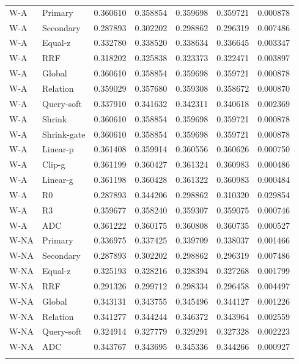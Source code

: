 \begin{table}[htbp]
\begin{tabular}{llrrrrr}
\addlinespace
W-A & Primary & 0.360610 & 0.358854 & 0.359698 & 0.359721 & 0.000878\\
W-A & Secondary & 0.287893 & 0.302202 & 0.298862 & 0.296319 & 0.007486\\
W-A & Equal-z & 0.332780 & 0.338520 & 0.338634 & 0.336645 & 0.003347\\
W-A & RRF & 0.318202 & 0.325838 & 0.323373 & 0.322471 & 0.003897\\
W-A & Global & 0.360610 & 0.358854 & 0.359698 & 0.359721 & 0.000878\\
W-A & Relation & 0.359029 & 0.357680 & 0.359308 & 0.358672 & 0.000870\\
W-A & Query-soft & 0.337910 & 0.341632 & 0.342311 & 0.340618 & 0.002369\\
W-A & Shrink & 0.360610 & 0.358854 & 0.359698 & 0.359721 & 0.000878\\
W-A & Shrink-gate & 0.360610 & 0.358854 & 0.359698 & 0.359721 & 0.000878\\
W-A & Linear-p & 0.361408 & 0.359914 & 0.360556 & 0.360626 & 0.000750\\
W-A & Clip-g & 0.361199 & 0.360427 & 0.361324 & 0.360983 & 0.000486\\
W-A & Linear-g & 0.361198 & 0.360428 & 0.361322 & 0.360983 & 0.000484\\
W-A & R0 & 0.287893 & 0.344206 & 0.298862 & 0.310320 & 0.029854\\
W-A & R3 & 0.359677 & 0.358240 & 0.359307 & 0.359075 & 0.000746\\
W-A & ADC & 0.361222 & 0.360175 & 0.360808 & 0.360735 & 0.000527\\
\addlinespace
W-NA & Primary & 0.336975 & 0.337425 & 0.339709 & 0.338037 & 0.001466\\
W-NA & Secondary & 0.287893 & 0.302202 & 0.298862 & 0.296319 & 0.007486\\
W-NA & Equal-z & 0.325193 & 0.328216 & 0.328394 & 0.327268 & 0.001799\\
W-NA & RRF & 0.291326 & 0.299712 & 0.298334 & 0.296458 & 0.004497\\
W-NA & Global & 0.343131 & 0.343755 & 0.345496 & 0.344127 & 0.001226\\
W-NA & Relation & 0.341277 & 0.344244 & 0.346372 & 0.343964 & 0.002559\\
W-NA & Query-soft & 0.324914 & 0.327779 & 0.329291 & 0.327328 & 0.002223\\
W-NA & ADC & 0.343767 & 0.343695 & 0.345336 & 0.344266 & 0.000927\\
\addlinespace
\bottomrule
\end{tabular}
\end{table}

